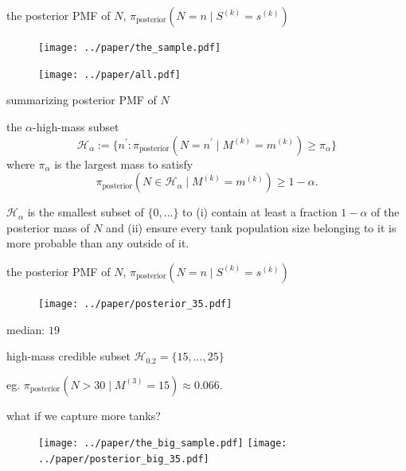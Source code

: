 \documentclass[10pt]{beamer}
\begin{document}
\begin{frame}[t]{the posterior PMF of $N$, $\pi_{\text{posterior}}(N=n \mid S^{(k)}=s^{(k)})$}
\begin{figure}[h!]
	\centering
	\texttt{[image: ../paper/the\_sample.pdf]}
	
	\texttt{[image: ../paper/all.pdf]}	
\end{figure}
\end{frame}


\begin{frame}[t]{summarizing posterior PMF of $N$}

\begin{alertblock}{the $\alpha$-high-mass subset }
\begin{equation}
	\mathcal{H}_\alpha := \{n^\prime : \pi_{\text{posterior}}(N=n^\prime \mid M^{(k)}=m^{(k)}) \geq \pi_\alpha\}
\end{equation} where $\pi_\alpha$ is the largest mass to satisfy 
\begin{equation}
	\pi_{\text{posterior}}(N \in \mathcal{H}_\alpha \mid M^{(k)}=m^{(k)}) \geq 1 - \alpha.
\end{equation}

\end{alertblock}
$\mathcal{H}_\alpha$ is the smallest subset of $\{0,...\}$ to (i) contain at least a fraction $1-\alpha$ of the posterior mass of $N$ and (ii) ensure every tank population size belonging to it is more probable than any outside of it.
\end{frame}


\begin{frame}[t]{the posterior PMF of $N$, $\pi_{\text{posterior}}(N=n \mid S^{(k)}=s^{(k)})$}
\begin{figure}[h!]
	\centering
	\texttt{[image: ../paper/posterior\_35.pdf]}
\end{figure}

median: $19$

high-mass credible subset $\mathcal{H}_{0.2}=\{15, ..., 25\}$

eg. $\pi_{\text{posterior}}(N>30 \mid M^{(3)}=15)\approx 0.066$.
\end{frame}

\begin{frame}[t]{what if we capture more tanks?}
  \begin{figure}[h!]
        	\centering
        	\texttt{[image: ../paper/the\_big\_sample.pdf]}
	 \texttt{[image: ../paper/posterior\_big\_35.pdf]}
\end{figure}
\end{frame}
\end{document}
